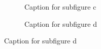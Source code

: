 \begin{refsection}
\begin{figure}[H]
	\vspace{1em}
	
	\begin{subfigure}[b]{0.40\textwidth}
		\centering
		\caption{Caption for subfigure c}
		\label{fig:firstFig:c}
	\end{subfigure}
	\hfill
	\begin{subfigure}[b]{0.40\textwidth}
		\centering
		\caption{Caption for subfigure d}
		\label{fig:firstFig:d}
	\end{subfigure}
	

\end{figure}
\end{refsection}
